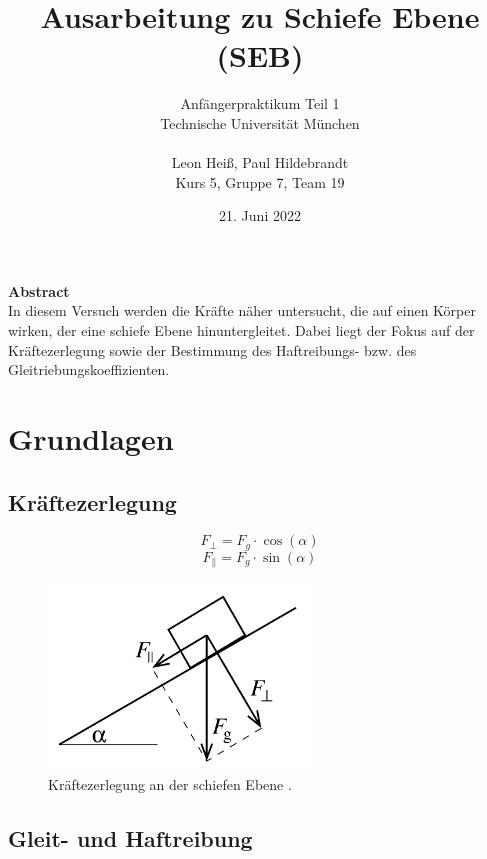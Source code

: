 \documentclass{article}
\title{Ausarbeitung zu Schiefe Ebene (SEB)}
\author{Anfängerpraktikum Teil 1 \\Technische Universität München\\\\Leon Heiß, Paul Hildebrandt \\
Kurs 5, Gruppe 7, Team 19}
\date{21. Juni 2022}
\begin{document}
\maketitle

\large
\begin{center}
\textbf{Abstract}\\
\normalsize
\medskip
In diesem Versuch werden die Kräfte näher untersucht, die auf einen Körper wirken, der eine
schiefe Ebene hinuntergleitet. Dabei liegt der Fokus auf der Kräftezerlegung sowie der Bestimmung
des Haftreibungs- bzw. des Gleitriebungskoeffizienten.

\end{center}
\normalsize

\tableofcontents

\section{Grundlagen}
\subsection{Kräftezerlegung}

\begin{equation}
    F_{\bot} = F_g \cdot \cos(\alpha)
\end{equation}
\begin{equation}
    F_{\parallel} = F_g \cdot \sin(\alpha)
\end{equation}



\begin{figure}[hbt!]
\centering
\includegraphics[width=200pt]{zerlegung.png}
\caption{Kräftezerlegung an der schiefen Ebene \cite{1}.}
\label{fig:length_eight_mouse}
\end{figure}

\subsection{Gleit- und Haftreibung}
\end{document}

